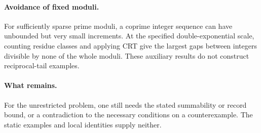\documentclass[11pt]{article}
\begin{document}
\paragraph{Avoidance of fixed moduli.}
For sufficiently sparse prime moduli, a coprime integer sequence can
have unbounded but very small increments. At the specified
double-exponential scale, counting residue classes and applying CRT give
the largest gaps between integers divisible by none of the whole moduli.
These auxiliary results do not construct reciprocal-tail examples.

\paragraph{What remains.}
For the unrestricted problem, one still needs the stated summability or
record bound, or a contradiction to the necessary conditions on a
counterexample. The static examples and local identities supply neither.
\end{document}
